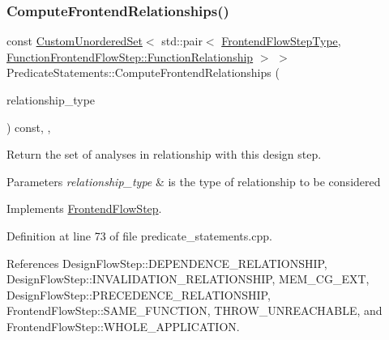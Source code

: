 \subsubsection{\texorpdfstring{Compute\+Frontend\+Relationships()}{ComputeFrontendRelationships()}}
{\footnotesize\ttfamily const \hyperlink{classCustomUnorderedSet}{Custom\+Unordered\+Set}$<$ std\+::pair$<$ \hyperlink{frontend__flow__step_8hpp_afeb3716c693d2b2e4ed3e6d04c3b63bb}{Frontend\+Flow\+Step\+Type}, \hyperlink{classFrontendFlowStep_af7cf30f2023e5b99e637dc2058289ab0}{Function\+Frontend\+Flow\+Step\+::\+Function\+Relationship} $>$ $>$ Predicate\+Statements\+::\+Compute\+Frontend\+Relationships (\begin{DoxyParamCaption}\item[{const \hyperlink{classDesignFlowStep_a723a3baf19ff2ceb77bc13e099d0b1b7}{Design\+Flow\+Step\+::\+Relationship\+Type}}]{relationship\+\_\+type }\end{DoxyParamCaption}) const\hspace{0.3cm}{\ttfamily [override]}, {\ttfamily [private]}, {\ttfamily [virtual]}}



Return the set of analyses in relationship with this design step. 


\begin{DoxyParams}{Parameters}
{\em relationship\+\_\+type} & is the type of relationship to be considered \\
\hline
\end{DoxyParams}


Implements \hyperlink{classFrontendFlowStep_abeaff70b59734e462d347ed343dd700d}{Frontend\+Flow\+Step}.



Definition at line 73 of file predicate\+\_\+statements.\+cpp.



References Design\+Flow\+Step\+::\+D\+E\+P\+E\+N\+D\+E\+N\+C\+E\+\_\+\+R\+E\+L\+A\+T\+I\+O\+N\+S\+H\+IP, Design\+Flow\+Step\+::\+I\+N\+V\+A\+L\+I\+D\+A\+T\+I\+O\+N\+\_\+\+R\+E\+L\+A\+T\+I\+O\+N\+S\+H\+IP, M\+E\+M\+\_\+\+C\+G\+\_\+\+E\+XT, Design\+Flow\+Step\+::\+P\+R\+E\+C\+E\+D\+E\+N\+C\+E\+\_\+\+R\+E\+L\+A\+T\+I\+O\+N\+S\+H\+IP, Frontend\+Flow\+Step\+::\+S\+A\+M\+E\+\_\+\+F\+U\+N\+C\+T\+I\+ON, T\+H\+R\+O\+W\+\_\+\+U\+N\+R\+E\+A\+C\+H\+A\+B\+LE, and Frontend\+Flow\+Step\+::\+W\+H\+O\+L\+E\+\_\+\+A\+P\+P\+L\+I\+C\+A\+T\+I\+ON.

\mbox{\label{classPredicateStatements_a1933a849ecb25e92d3a13d2e6be605b6}} 
